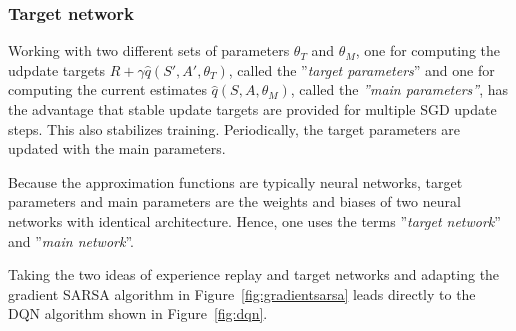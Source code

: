 \subsubsection*{Target network}

Working with two different sets of parameters $\theta_T$ and $\theta_M$, one for computing the udpdate targets $R + \gamma \hat{q}(S', A', \theta_T)$, called the ''\emph{target parameters}'' and one for computing the current estimates $\hat{q}(S, A, \theta_M)$, called the \emph{''main parameters''}, has the advantage that stable update targets are provided for multiple SGD update steps. This also stabilizes training. Periodically, the target parameters are updated with the main parameters.

Because the approximation functions are typically neural networks, target parameters and main parameters are the weights and biases of two neural networks with identical architecture. Hence, one uses the terms ''\emph{target network}'' and ''\emph{main network}''.

Taking the two ideas of experience replay and target networks and adapting the gradient SARSA algorithm in Figure~\ref{fig:gradientsarsa} leads directly to the DQN algorithm shown in Figure~\ref{fig:dqn}.

